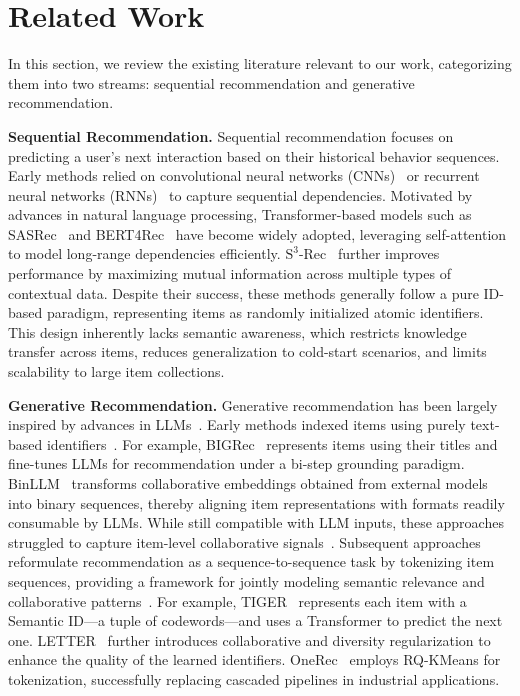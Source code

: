 \section{Related Work}
\label{sec:related}

In this section, we review the existing literature relevant to our work, categorizing them into two streams: sequential recommendation and generative recommendation.

\vspace{+3pt}
\textbf{Sequential Recommendation.} Sequential recommendation focuses on predicting a user's next interaction based on their historical behavior sequences. Early methods relied on convolutional neural networks (CNNs)~\cite{Caser} or recurrent neural networks (RNNs)~\cite{GRU4Rec} to capture sequential dependencies. Motivated by advances in natural language processing, Transformer-based models such as SASRec~\cite{SASRec} and BERT4Rec~\cite{BERT4Rec} have become widely adopted, leveraging self-attention to model long-range dependencies efficiently. $\text{S}^3$-Rec~\cite{S3-Rec} further improves performance by maximizing mutual information across multiple types of contextual data. Despite their success, these methods generally follow a pure ID-based paradigm, representing items as randomly initialized atomic identifiers. This design inherently lacks semantic awareness, which restricts knowledge transfer across items, reduces generalization to cold-start scenarios, and limits scalability to large item collections.

\vspace{+3pt}
\textbf{Generative Recommendation.} Generative recommendation has been largely inspired by advances in LLMs~\cite{qwen3, GeneRec,hou2025generative,kuaishou_survey,li-etal-2024-large}. Early methods indexed items using purely text-based identifiers~\cite{P5,IDGenRec,BIGRec}. For example, BIGRec~\cite{BIGRec} represents items using their titles and fine-tunes LLMs for recommendation under a bi-step grounding paradigm. BinLLM~\cite{BinLLM} transforms collaborative embeddings obtained from external models into binary sequences, thereby aligning item representations with formats readily consumable by LLMs. While still compatible with LLM inputs, these approaches struggled to capture item-level collaborative signals~\cite{CoLLM,BinLLM,llara}. Subsequent approaches reformulate recommendation as a sequence-to-sequence task by tokenizing item sequences, providing a framework for jointly modeling semantic relevance and collaborative patterns~\cite{EAGER,SEATER,TIGER,LETTER,DiscRec,LC-Rec}. For example, TIGER~\cite{TIGER} represents each item with a Semantic ID—a tuple of codewords—and uses a Transformer to predict the next one. LETTER~\cite{LETTER} further introduces collaborative and diversity regularization to enhance the quality of the learned identifiers. OneRec~\cite{Onerec-v2} employs RQ-KMeans for tokenization, successfully replacing cascaded pipelines in industrial applications. 

